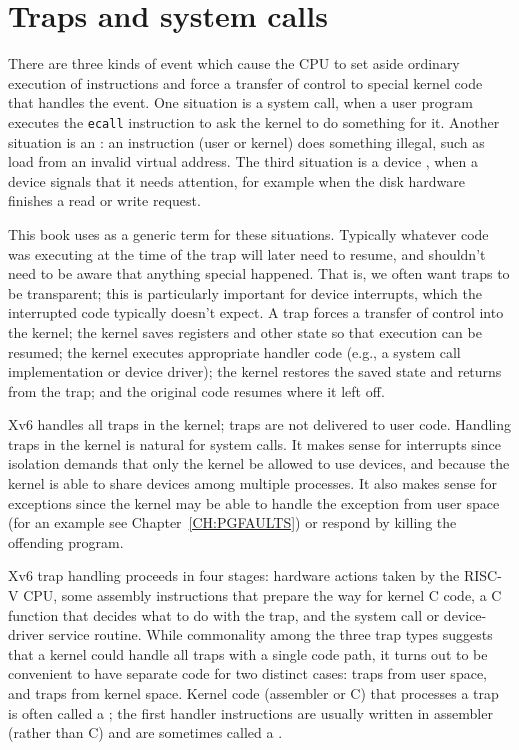 \chapter{Traps and system calls}
\label{CH:TRAP}

There are three kinds of event which cause the CPU to set
aside ordinary execution of instructions and force a
transfer of control to special kernel code that handles the event. One
situation is a system call, when a user program 
executes the {\tt ecall} instruction to ask the kernel to do 
something for it. Another situation is an :
an instruction (user or kernel) does something illegal, such as 
load from an invalid virtual address. The third situation is a
device , when a device signals that it needs
attention, for example when the disk hardware finishes a read or write
request.

This book uses  as a generic term for these
situations. Typically whatever code was executing at the time of the
trap will later need to resume, and shouldn't need to be aware that
anything special happened. That is, we often want traps to be
transparent; this is particularly important for device interrupts, which the
interrupted code typically doesn't expect. 
A trap forces a transfer of control into the kernel; the kernel saves
registers and other state so that execution can be resumed; the kernel
executes appropriate handler code (e.g., a system call implementation
or device driver); the kernel restores the saved state and returns
from the trap; and the original code resumes where it left off.

Xv6 handles all traps in the kernel; traps are not delivered to user
code. Handling traps in the kernel is natural for system calls. It
makes sense for interrupts since isolation demands that only the
kernel be allowed to use devices,
and because the kernel is able to
share devices among multiple processes.
It also makes sense for exceptions since the kernel may be able to
handle the exception from user space (for an example see
Chapter~\ref{CH:PGFAULTS}) or respond by killing the offending
program.

Xv6 trap handling proceeds in four stages: hardware actions taken by
the RISC-V CPU, some assembly instructions that prepare the way for
kernel C code, a C function that decides what to do with the trap,
and the system call or device-driver service routine. While
commonality among the three trap types suggests that a kernel could
handle all traps with a single code path, it turns out to be
convenient to have separate code for
two distinct cases: traps from user space, and traps from kernel space.
Kernel code (assembler or C) that
processes a trap is often called a ;
the first handler instructions are usually written in assembler
(rather than C) and are sometimes called a .

